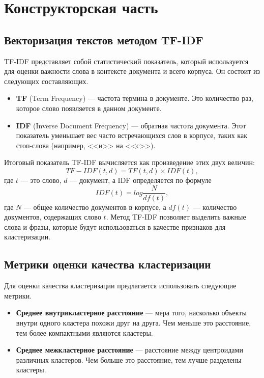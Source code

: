 \chapter{Конструкторская часть}



\section{Векторизация текстов методом TF-IDF}

TF-IDF представляет собой статистический показатель, который используется для оценки важности слова в контексте документа и всего корпуса. Он состоит из следующих составляющих.
\begin{itemize}[label*=---]
	\item \textbf{TF} (Term Frequency) — частота термина в документе. Это количество раз, которое слово появляется в данном документе.
	\item \textbf{IDF} (Inverse Document Frequency) — обратная частота документа. Этот показатель уменьшает вес часто встречающихся слов в корпусе, таких как стоп-слова (например, <<и>> на <<с>>).
\end{itemize}

Итоговый показатель TF-IDF вычисляется как произведение этих двух величин:
\begin{equation}
	TF-IDF(t, d) = TF(t, d) \times IDF(t),
\end{equation}
где $t$ --- это слово, $d$ --- документ, а IDF определяется по формуле
\begin{equation}
	IDF(t)=log \frac{N}{df(t)},
\end{equation}
где $N$ --- общее количество документов в корпусе, а $df(t)$ — количество документов, содержащих слово $t$. Метод TF-IDF позволяет выделить важные слова и фразы, которые будут использоваться в качестве признаков для кластеризации.



\section{Метрики оценки качества кластеризации}

Для оценки качества кластеризации предлагается использовать следующие метрики.
\begin{itemize}[label*=---]
	\item \textbf{Среднее внутрикластерное расстояние} --- мера того, насколько объекты внутри одного кластера похожи друг на друга. Чем меньше это расстояние, тем более компактными являются кластеры.
	\item \textbf{Среднее межкластерное расстояние} --- расстояние между центроидами различных кластеров. Чем больше это расстояние, тем лучше разделены кластеры.
\end{itemize}

